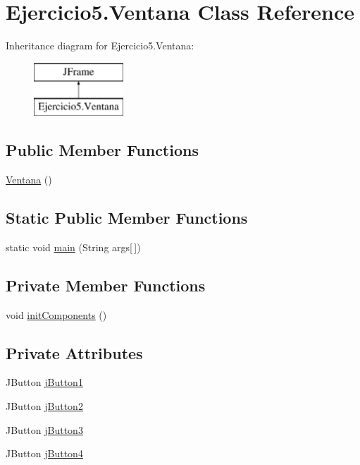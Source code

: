 \hypertarget{class_ejercicio5_1_1_ventana}{}\section{Ejercicio5.\+Ventana Class Reference}
\label{class_ejercicio5_1_1_ventana}
Inheritance diagram for Ejercicio5.\+Ventana\+:\begin{figure}[H]
\begin{center}
\leavevmode
\includegraphics[height=2.000000cm]{class_ejercicio5_1_1_ventana}
\end{center}
\end{figure}
\subsection*{Public Member Functions}
\begin{DoxyCompactItemize}
\item 
\mbox{\hyperlink{class_ejercicio5_1_1_ventana_af500cbb97dc8386f5c85ac586ae6f27c}{Ventana}} ()
\end{DoxyCompactItemize}
\subsection*{Static Public Member Functions}
\begin{DoxyCompactItemize}
\item 
static void \mbox{\hyperlink{class_ejercicio5_1_1_ventana_a9180f053f31fc66d34922b39d96dcf06}{main}} (String args\mbox{[}$\,$\mbox{]})
\end{DoxyCompactItemize}
\subsection*{Private Member Functions}
\begin{DoxyCompactItemize}
\item 
void \mbox{\hyperlink{class_ejercicio5_1_1_ventana_a289f25e67f2066d3c811dedfea83b8b5}{init\+Components}} ()
\end{DoxyCompactItemize}
\subsection*{Private Attributes}
\begin{DoxyCompactItemize}
\item 
J\+Button \mbox{\hyperlink{class_ejercicio5_1_1_ventana_a702e08175eb5d9e0c166057793e3485f}{j\+Button1}}
\item 
J\+Button \mbox{\hyperlink{class_ejercicio5_1_1_ventana_a88c68c1181c9c77989b5bc2dc1077e61}{j\+Button2}}
\item 
J\+Button \mbox{\hyperlink{class_ejercicio5_1_1_ventana_ad6b3375b47f266259e624fe196b01145}{j\+Button3}}
\item 
J\+Button \mbox{\hyperlink{class_ejercicio5_1_1_ventana_ab6ffbdcee4107a3c8b53abc7c160db05}{j\+Button4}}
\end{DoxyCompactItemize}


